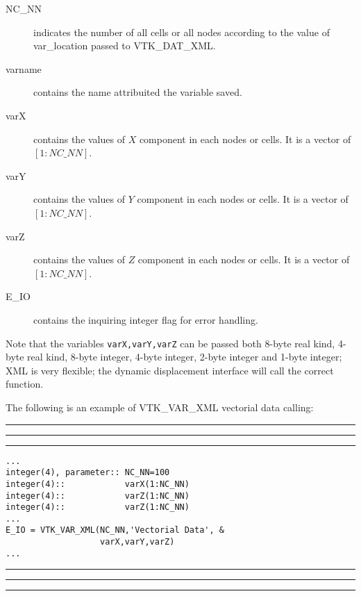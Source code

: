 \documentclass[pagesize=pdftex,fontsize=10pt,paper=a4,oneside]{scrbook}
\DeclareRobustCommand{\MarginNote}[1]{\marginpar{%
\slshape\footnotesize%
\parindent=0pt\lineskip=0pt\lineskiplimit=0pt%
\tolerance=2000\hyphenpenalty=300\exhyphenpenalty=300%
\doublehyphendemerits=100000\finalhyphendemerits=\doublehyphendemerits%
\raggedright\hspace{0pt}#1}}
\newenvironment{boxred}[1]%
               {%
                \noindent\hspace*{-0.025\textwidth}%
                \color{Maroon}%
                \rule[-5.8pt]{0.6pt}{6pt}\hspace*{-0.6pt}\rule{1.05\textwidth}{0.6pt}\hspace*{-0.6pt}\rule[-5.8pt]{0.6pt}{6pt}%
                \color{black}%
                \vspace*{0.6pt}\MarginNote{\color{Maroon}{#1}}%
               }%
               {%
                \noindent\hspace*{-0.025\textwidth}%
                \color{Maroon}%
                \rule[0pt]{0.6pt}{6pt}\hspace*{-0.6pt}\rule{1.05\textwidth}{0.6pt}\hspace*{-0.6pt}\rule[0pt]{0.6pt}{6pt}%
                \color{black}%
                \vspace*{2mm}%
               }
\begin{document}
\begin{description}
 \item[{\color{RoyalBlue}NC\_NN}] indicates the number of all cells or all nodes according to the value of
                                  {\color{RoyalBlue}var\_location} passed to VTK\_DAT\_XML.
 \item[{\color{RoyalBlue}varname}] contains the name attribuited the variable saved.
 \item[{\color{RoyalBlue}varX}] contains the values of $X$ component in each nodes or cells. It is a vector of $[1:NC\_NN]$.
 \item[{\color{RoyalBlue}varY}] contains the values of $Y$ component in each nodes or cells. It is a vector of $[1:NC\_NN]$.
 \item[{\color{RoyalBlue}varZ}] contains the values of $Z$ component in each nodes or cells. It is a vector of $[1:NC\_NN]$.
 \item[{\color{RoyalBlue}E\_IO}] contains the inquiring integer flag for error handling.
\end{description}

Note that the variables \texttt{varX,varY,varZ} can be passed both 8-byte real kind, 4-byte real kind, 8-byte integer,
4-byte integer, 2-byte integer and 1-byte integer; XML is very flexible; the dynamic displacement interface will call
the correct function.

The following is an example of VTK\_VAR\_XML vectorial data calling:

\begin{boxred}{VTK\_VAR\_XML Vectorial Data Calling}
\begin{verbatim}
...
integer(4), parameter:: NC_NN=100
integer(4)::            varX(1:NC_NN)
integer(4)::            varZ(1:NC_NN)
integer(4)::            varZ(1:NC_NN)
...
E_IO = VTK_VAR_XML(NC_NN,'Vectorial Data', &
                   varX,varY,varZ)
...
\end{verbatim}
\end{boxred}
\end{document}

